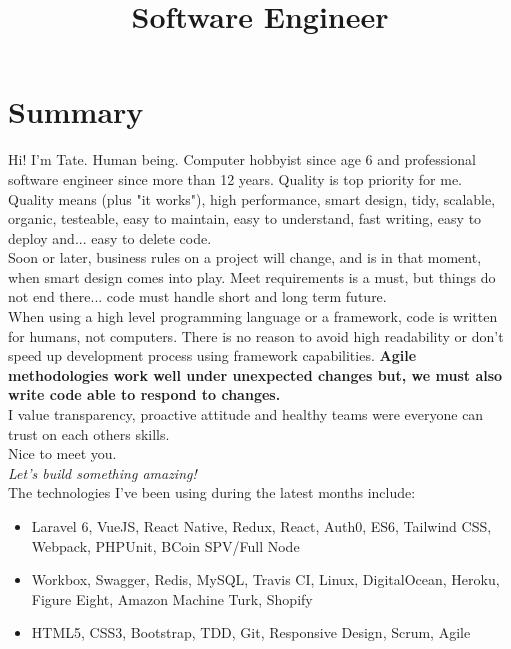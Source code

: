 \documentclass[11pt,a4paper,sans]{moderncv}        %
\title{Software Engineer}                               %
\begin{document}
\makecvtitle

\section{Summary}

Hi! I’m Tate. Human being. Computer hobbyist since age 6 and professional software engineer since more than 12 years.
Quality is top priority for me. Quality means (plus "it works"), high performance, smart design, tidy, scalable, organic, testeable, easy to maintain, easy to understand, fast writing, easy to deploy and... easy to delete code.\\


Soon or later, business rules on a project will change, and is in that moment, when smart design comes into play.
Meet requirements is a must, but things do not end there... code must handle short and long term future.\\

When using a high level programming language or a framework, code is written for humans, not computers. There is no reason to avoid high readability or don't speed up development process using framework capabilities.
\textbf{Agile methodologies work well under unexpected changes but, we must also write code able to respond to changes.}\\

I value transparency, proactive attitude and healthy teams were everyone can trust on each others skills.\\

Nice to meet you.\\
\textit{Let's build something amazing!}\\

\medskip The technologies I've been using during the latest months include:
\begin{itemize}
  \item Laravel 6, VueJS, React Native, Redux, React, Auth0, ES6, Tailwind CSS, Webpack, PHPUnit, BCoin SPV/Full Node
  \item Workbox, Swagger, Redis, MySQL, Travis CI, Linux, DigitalOcean, Heroku, Figure Eight, Amazon Machine Turk, Shopify
  \item HTML5, CSS3, Bootstrap, TDD, Git, Responsive Design, Scrum, Agile
\end{itemize}
\end{document}
